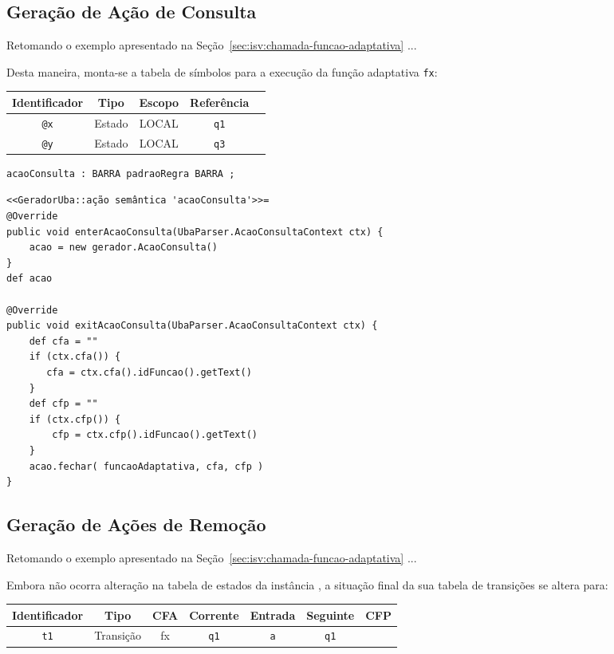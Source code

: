 \subsection{Geração de Ação de Consulta}
\label{sec:isv:geracao-consulta}

Retomando o exemplo apresentado na Seção~\ref{sec:isv:chamada-funcao-adaptativa} ...

Desta maneira, monta-se a tabela de símbolos para a execução da função adaptativa \lstinline|fx|:

  \begin{center}\begin{tabular}{c c c c c }
  Identificador   & Tipo  & Escopo    & Referência \\
  \hline
  \lstinline|@x|	& Estado & LOCAL  & \lstinline|q1| \\
  \lstinline|@y|	& Estado & LOCAL  & \lstinline|q3| \\
  \end{tabular}\end{center}

\begin{lstlisting}[style=antlr]
acaoConsulta : BARRA padraoRegra BARRA ;
\end{lstlisting}

\begin{lstlisting}
<<GeradorUba::ação semântica 'acaoConsulta'>>=
@Override
public void enterAcaoConsulta(UbaParser.AcaoConsultaContext ctx) {
    acao = new gerador.AcaoConsulta()
}
def acao

@Override
public void exitAcaoConsulta(UbaParser.AcaoConsultaContext ctx) {
    def cfa = ""
    if (ctx.cfa()) {
       cfa = ctx.cfa().idFuncao().getText()
    }
    def cfp = ""
    if (ctx.cfp()) {
        cfp = ctx.cfp().idFuncao().getText()
    }
    acao.fechar( funcaoAdaptativa, cfa, cfp )
}
\end{lstlisting}

\subsection{Geração de Ações de Remoção}
\label{sec:isv:geracao-remocao}

Retomando o exemplo apresentado na Seção~\ref{sec:isv:chamada-funcao-adaptativa} ...

Embora não ocorra alteração na tabela de estados da instância , a situação final da sua tabela de transições se altera para:

   \begin{center}\begin{tabular}{c c c c c c c}
   Identificador   & Tipo  & CFA    & Corrente & Entrada & Seguinte & CFP \\
   \hline
   \lstinline|t1|	& Transição & fx  & \lstinline|q1| & \lstinline|a| & \lstinline|q1| &
   \end{tabular}\end{center}

